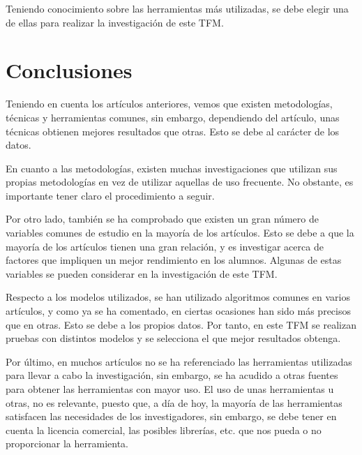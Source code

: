 Teniendo conocimiento sobre las herramientas más utilizadas, se debe elegir una de ellas para realizar la investigación de este TFM.



\section{Conclusiones}

Teniendo en cuenta los artículos anteriores, vemos que existen metodologías, técnicas y herramientas comunes, sin embargo, dependiendo del artículo, unas técnicas obtienen mejores resultados que otras. Esto se debe al carácter de los datos. 

En cuanto a las metodologías, existen muchas investigaciones que utilizan sus propias metodologías en vez de utilizar aquellas de uso frecuente. No obstante, es importante tener claro el procedimiento a seguir.

Por otro lado, también se ha comprobado que existen un gran número de variables comunes de estudio en la mayoría de los artículos. Esto se debe a que la mayoría de los artículos tienen una gran relación, y es investigar acerca de factores que impliquen un mejor rendimiento en los alumnos. Algunas de estas variables se pueden considerar en la investigación de este TFM.

Respecto a los modelos utilizados, se han utilizado algoritmos comunes en varios artículos, y como ya se ha comentado, en ciertas ocasiones han sido más precisos que en otras. Esto se debe a los propios datos. Por tanto, en este TFM se realizan pruebas con distintos modelos y se selecciona el que mejor resultados obtenga.

Por último, en muchos artículos no se ha referenciado las herramientas utilizadas para llevar a cabo la investigación, sin embargo, se ha acudido a otras fuentes para obtener las herramientas con mayor uso. El uso de unas herramientas u otras, no es relevante, puesto que, a día de hoy, la mayoría de las herramientas satisfacen las necesidades de los investigadores, sin embargo, se debe tener en cuenta la licencia comercial, las posibles librerías, etc. que nos pueda o no proporcionar la herramienta.


